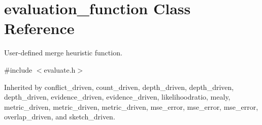 \hypertarget{classevaluation__function}{}\section{evaluation\+\_\+function Class Reference}
\label{classevaluation__function}


User-\/defined merge heuristic function.  




{\ttfamily \#include $<$evaluate.\+h$>$}



Inherited by conflict\+\_\+driven, count\+\_\+driven, depth\+\_\+driven, depth\+\_\+driven, depth\+\_\+driven, evidence\+\_\+driven, evidence\+\_\+driven, likelihoodratio, mealy, metric\+\_\+driven, metric\+\_\+driven, metric\+\_\+driven, mse\+\_\+error, mse\+\_\+error, mse\+\_\+error, overlap\+\_\+driven, and sketch\+\_\+driven.

